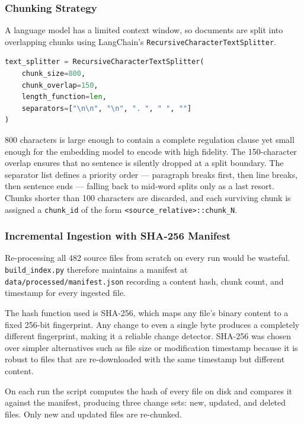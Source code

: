 \subsubsection{Chunking Strategy}

A language model has a limited context window, so documents are split into
overlapping chunks using LangChain's \texttt{RecursiveCharacterTextSplitter}.

\begin{lstlisting}[language=Python]
text_splitter = RecursiveCharacterTextSplitter(
    chunk_size=800,
    chunk_overlap=150,
    length_function=len,
    separators=["\n\n", "\n", ". ", " ", ""]
)
\end{lstlisting}

800 characters is large enough to contain a complete regulation clause yet
small enough for the embedding model to encode with high fidelity. The
150-character overlap ensures that no sentence is silently dropped at a split
boundary. The separator list defines a priority order — paragraph breaks first,
then line breaks, then sentence ends — falling back to mid-word splits only as
a last resort. Chunks shorter than 100 characters are discarded, and each
surviving chunk is assigned a \texttt{chunk\_id} of the form
\texttt{<source\_relative>::chunk\_N}.

\subsubsection{Incremental Ingestion with SHA-256 Manifest}
\label{sec:impl-sha256}
Re-processing all 482 source files from scratch on every run would be
wasteful. \texttt{build\_index.py} therefore maintains a manifest at
\texttt{data/processed/manifest.json} recording a content hash, chunk
count, and timestamp for every ingested file.

The hash function used is SHA-256, which maps any file's binary content to
a fixed 256-bit fingerprint. Any change to even a single byte produces a
completely different fingerprint, making it a reliable change detector.
SHA-256 was chosen over simpler alternatives such as file size or
modification timestamp because it is robust to files that are re-downloaded
with the same timestamp but different content.

On each run the script computes the hash of every file on disk and compares it
against the manifest, producing three change sets: new, updated, and deleted
files. Only new and updated files are re-chunked.

